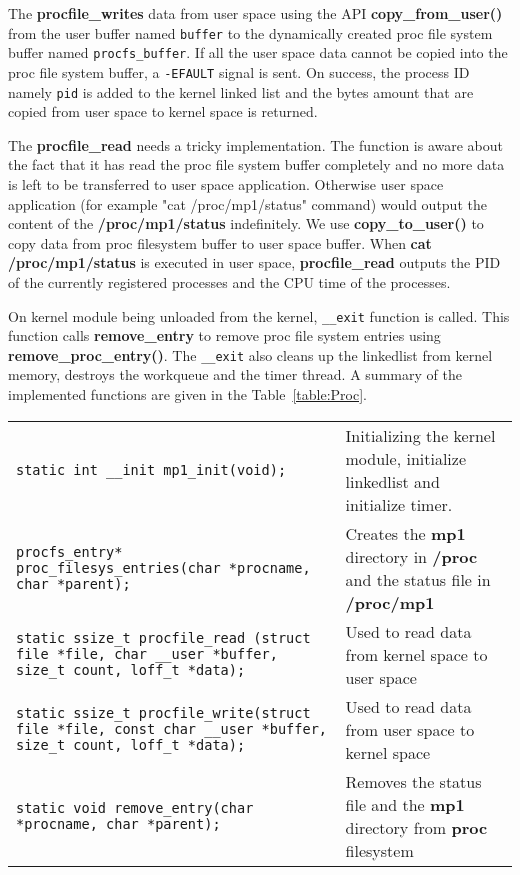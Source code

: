 \documentclass[11pt]{article}
\begin{document}
The {\bf procfile\_writes} data from user space using the API {\bf copy\_from\_user()} from the user buffer named {\tt buffer} to the dynamically created proc file system buffer named {\tt procfs\_buffer}. If all the user space data cannot be copied into the proc file system buffer, a {\tt -EFAULT} signal is sent. On success, the process ID namely {\tt pid}  is added to the kernel linked list and the bytes amount that are copied from user space to kernel space is returned. 

The {\bf procfile\_read} needs a tricky implementation. The function is aware about the fact that it has read the proc file system buffer completely and no more data is left to be transferred to user space application. Otherwise user space application (for example "cat /proc/mp1/status" command) would output the content of the {\bf /proc/mp1/status} indefinitely. We use {\bf copy\_to\_user()} to copy data from proc filesystem buffer to user space buffer. When {\bf cat /proc/mp1/status} is executed in user space, {\bf procfile\_read} outputs the PID of the currently registered processes and the CPU time of the processes.

On kernel module being unloaded from the kernel, {\tt \_\_exit} function is called. This function calls {\bf remove\_entry} to remove proc file system entries using {\bf remove\_proc\_entry()}. The {\tt \_\_exit} also cleans up the linkedlist from kernel memory, destroys the workqueue and the timer thread. A summary of the implemented functions are given in the Table~\ref{table:Proc}.

\begin{table*}[h]
  \centering
  \rcow
  \caption{List of functions to insert and remove kernel module, read and write proc file system\label{table:Proc}}
  \begin{tabular}{|p{7cm}|p{8cm}|}
    {\tt static int \_\_init mp1\_init(void);}  &  Initializing the kernel module, initialize linkedlist and initialize timer.  \\
    {\tt procfs\_entry* proc\_filesys\_entries(char *procname, char *parent);}     &  Creates the {\bf mp1} directory in {\bf /proc} and the status file in {\bf /proc/mp1}  \\
    {\tt static ssize\_t procfile\_read (struct file *file, char \_\_user *buffer, size\_t count, loff\_t *data);}&  Used to read data from kernel space to user space\\
    {\tt static ssize\_t procfile\_write(struct file *file, const char \_\_user *buffer, size\_t count, loff\_t *data);}&  Used to read data from user space to kernel space\\
    {\tt static void remove\_entry(char *procname, char *parent);}  & Removes the status file and the {\bf mp1} directory from {\bf proc} filesystem   \\
  \end{tabular}
\end{table*}
\end{document}
